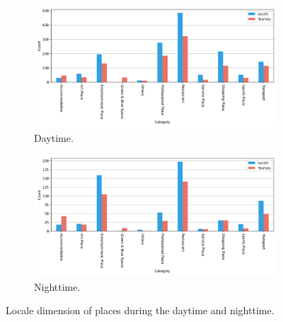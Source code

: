 \documentclass{article}
\theoremstyle{definition}
\theoremstyle{remark}
\begin{document}
\begin{figure}[!h]

\centering
\begin{subfigure}{0.6\textheight}
\centering
\includegraphics[width=0.9\linewidth]{figures/places_locale_daytime.png} 
\caption{Daytime.}
\label{fig:places_locale_daytime}
\end{subfigure}
\begin{subfigure}{0.6\textheight}
\centering
\includegraphics[width=0.9\linewidth]{figures/places_locale_nighttime.png}
\caption{Nighttime.}
\label{fig:places_locale_nighttime}
\end{subfigure}

\caption{Locale dimension of places during the daytime and nighttime.}
\label{fig:places_locale_day}
\end{figure}
\end{document}
